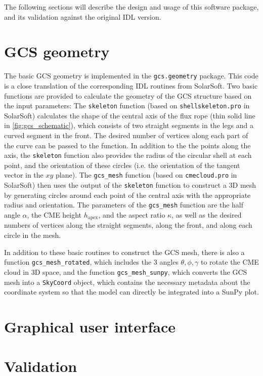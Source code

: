 The following sections will describe the design and usage of this software package, and its validation against the original IDL version.

\section{GCS geometry}

The basic GCS geometry is implemented in the \texttt{gcs.geometry} package. This code is a close translation of the corresponding IDL routines from SolarSoft. Two basic functions are provided to calculate the geometry of the GCS structure based on the input parameters: The \texttt{skeleton} function (based on \texttt{shellskeleton.pro} in SolarSoft) calculates the shape of the central axis of the flux rope (thin solid line in \autoref{fig:gcs_schematic}), which consists of two straight segments in the legs and a curved segment in the front. The desired number of vertices along each part of the curve can be passed to the function.
In addition to the the points along the axis, the \texttt{skeleton} function also provides the radius of the circular shell at each point, and the orientation of these circles (i.e. the orientation of the tangent vector in the $xy$ plane).
The \verb|gcs_mesh| function (based on \texttt{cmecloud.pro} in SolarSoft) then uses the output of the \texttt{skeleton} function to construct a 3D mesh by generating circles around each point of the central axis with the appropriate radius and orientation. The parameters of the \verb|gcs_mesh| function are the half angle $\alpha$, the CME height $h_\text{apex}$, and the aspect ratio $\kappa$, as well as the desired numbers of vertices along the straight segments, along the front, and along each circle in the mesh.


In addition to these basic routines to construct the GCS mesh, there is also a function \verb|gcs_mesh_rotated|, which includes the 3 angles $\theta, \phi, \gamma$ to rotate the CME cloud in 3D space, and the function \verb|gcs_mesh_sunpy|, which converts the GCS mesh into a \texttt{SkyCoord} object, which contains the necessary metadata about the coordinate system so that the model can directly be integrated into a SunPy plot.

\section{Graphical user interface}

\section{Validation}
